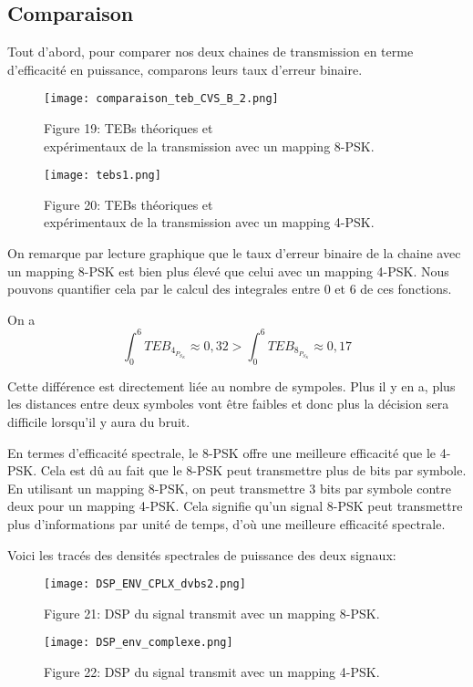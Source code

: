 \documentclass[englishb]{article}
\begin{document}
\subsection{Comparaison}

Tout d'abord, pour comparer nos deux chaines de transmission en terme d'efficacité en puissance, comparons leurs taux d'erreur binaire.


\begin{figure}[H]
   \begin{minipage}[b]{0.48\linewidth}
      \centering \texttt{[image: comparaison\_teb\_CVS\_B\_2.png]}

      Figure 19: TEBs théoriques et \\expérimentaux de la transmission avec un mapping 8-PSK.
   \end{minipage}
   \begin{minipage}[b]{0.48\linewidth}   
      \centering \texttt{[image: tebs1.png]}

      Figure 20: TEBs théoriques et \\expérimentaux de la transmission avec un mapping 4-PSK.
   \end{minipage}
\end{figure}

On remarque par lecture graphique que le taux d'erreur binaire de la chaine avec un mapping 8-PSK est bien plus élevé que celui avec un mapping 4-PSK. Nous pouvons quantifier cela par le calcul des integrales entre 0 et 6 de ces fonctions.

On a $$\int_{0}^{6}TEB_4_P_S_K \approx 0,32 > \int_{0}^{6}TEB_8_P_S_K \approx 0,17$$

Cette différence est directement liée au nombre de sympoles. Plus il y en a, plus les distances entre deux symboles vont être faibles et donc plus la décision sera difficile lorsqu'il y aura du bruit.

En termes d'efficacité spectrale, le 8-PSK offre une meilleure efficacité que le 4-PSK. Cela est dû au fait que le 8-PSK peut transmettre plus de bits par symbole. En utilisant un mapping 8-PSK, on peut transmettre 3 bits par symbole contre deux pour un mapping 4-PSK. Cela signifie qu'un signal 8-PSK peut transmettre plus d'informations par unité de temps, d'où une meilleure efficacité spectrale.

Voici les tracés des densités spectrales de puissance des deux signaux:

\begin{figure}[H]
   \begin{minipage}[b]{0.48\linewidth}
      \centering \texttt{[image: DSP\_ENV\_CPLX\_dvbs2.png]}

      Figure 21: DSP du signal transmit avec un mapping 8-PSK.
   \end{minipage}
   \begin{minipage}[b]{0.48\linewidth}   
      \centering \texttt{[image: DSP\_env\_complexe.png]}

      Figure 22: DSP du signal transmit avec un mapping 4-PSK.
   \end{minipage}
\end{figure}
\end{document}

